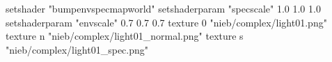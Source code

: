 setshader "bumpenvspecmapworld"
setshaderparam "specscale" 1.0 1.0 1.0
setshaderparam "envscale"  0.7 0.7 0.7
   texture 0 "nieb/complex/light01.png"
   texture n "nieb/complex/light01_normal.png"
   texture s "nieb/complex/light01_spec.png"
